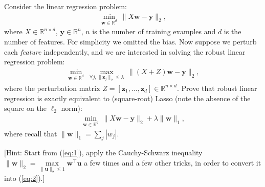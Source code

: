 \documentclass[10pt,letter,notitlepage]{article}
\newcommand{\RR}{\mathds{R}}
\newcommand{\wv}{\mathbf{w}}
\newcommand{\yv}{\mathbf{y}}
\newcommand{\zv}{\mathbf{z}}
\newcommand{\uv}{\mathbf{u}}
\newcounter{exercise}
\begin{document}
\begin{exercise}
	Consider the linear regression problem:
	\begin{align}
	\min_{\wv \in \RR^d} ~ \|X \wv - \yv\|_2,
	\end{align}
	where $X \in \RR^{n \times d}$, $\yv \in \RR^n$, $n$ is the number of training examples and $d$ is the number of features. For simplicity we omitted the bias. Now suppose we perturb each \emph{feature} independently, and we are interested in solving the robust linear regression problem:
	\begin{align}
    \min_{\wv\in\RR^d} ~ \max_{\forall j, \|\zv_j\|_2 \leq \lambda} ~ \|(X + Z)\wv - \yv\|_2, \label{eq:1}
	\end{align}
	where the perturbation matrix $Z = [\zv_1, \ldots, \zv_d] \in \RR^{n \times d}$. Prove that robust linear regression is exactly equivalent to (square-root) Lasso (note the absence of the square on the $\ell_2$ norm):
	\begin{align}
    \min_{\wv \in \RR^d} ~ \| X \wv - \yv\|_2 + \lambda\|\wv\|_1, \label{eq:2}
	\end{align}
	where recall that $\|\wv\|_1 = \sum_j |w_j|$.

  [Hint: Start from (\ref{eq:1}), apply the Cauchy-Schwarz inequality $\|\wv\|_2 = \max\limits_{\|\uv\|_2 \leq 1} \wv^\top\uv$ a few times and a few other tricks, in order to convert it into (\ref{eq:2}).]

\end{exercise}
\end{document}
